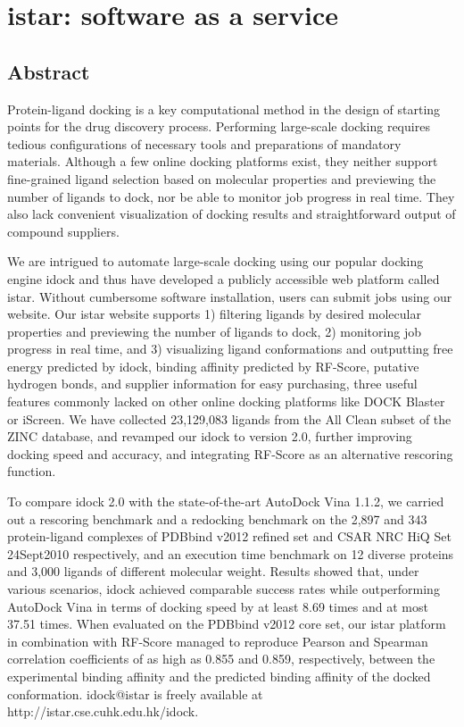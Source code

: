 \chapter{istar: software as a service}
\label{istar}

\section{Abstract}

Protein-ligand docking is a key computational method in the design of starting points for the drug discovery process. Performing large-scale docking requires tedious configurations of necessary tools and preparations of mandatory materials. Although a few online docking platforms exist, they neither support fine-grained ligand selection based on molecular properties and previewing the number of ligands to dock, nor be able to monitor job progress in real time. They also lack convenient visualization of docking results and straightforward output of compound suppliers.

We are intrigued to automate large-scale docking using our popular docking engine idock and thus have developed a publicly accessible web platform called istar. Without cumbersome software installation, users can submit jobs using our website. Our istar website supports 1) filtering ligands by desired molecular properties and previewing the number of ligands to dock, 2) monitoring job progress in real time, and 3) visualizing ligand conformations and outputting free energy predicted by idock, binding affinity predicted by RF-Score, putative hydrogen bonds, and supplier information for easy purchasing, three useful features commonly lacked on other online docking platforms like DOCK Blaster or iScreen. We have collected 23,129,083 ligands from the All Clean subset of the ZINC database, and revamped our idock to version 2.0, further improving docking speed and accuracy, and integrating RF-Score as an alternative rescoring function.

To compare idock 2.0 with the state-of-the-art AutoDock Vina 1.1.2, we carried out a rescoring benchmark and a redocking benchmark on the 2,897 and 343 protein-ligand complexes of PDBbind v2012 refined set and CSAR NRC HiQ Set 24Sept2010 respectively, and an execution time benchmark on 12 diverse proteins and 3,000 ligands of different molecular weight. Results showed that, under various scenarios, idock achieved comparable success rates while outperforming AutoDock Vina in terms of docking speed by at least 8.69 times and at most 37.51 times. When evaluated on the PDBbind v2012 core set, our istar platform in combination with RF-Score managed to reproduce Pearson and Spearman correlation coefficients of as high as 0.855 and 0.859, respectively, between the experimental binding affinity and the predicted binding affinity of the docked conformation. idock@istar is freely available at http://istar.cse.cuhk.edu.hk/idock.

